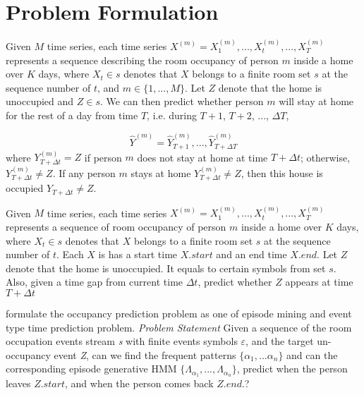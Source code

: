 \section{Problem Formulation}
Given $M$ time series, 
each time series $X^{(m)}=X^{(m)}_1, ..., X^{(m)}_t, ..., X_T^{(m)}$ 
represents a sequence describing the room occupancy of person $m$ inside 
a home over $K$ days, 
where $X_t\in s$ denotes that $X$ belongs to a finite room set $s$ at the sequence number of $t$, 
and $m\in\{1,...,M\}$. 
Let $Z$ denote that the home is unoccupied and $Z\in s$.  %
We can then predict whether person $m$ will stay at home for the rest of a day from time $T$,  i.e. during $T+1$, $T+2$, ..., $\Delta T$, 
 
\begin{equation}
\hat{Y}^{(m)}=\hat{Y}_{T+1}^{(m)},...,\hat{Y}^{(m)}_{T+\Delta T}
\end{equation}
where $Y_{T+\Delta t }^{(m)}=Z$ if person $m$ does not stay at home at time $T+\Delta t $;
otherwise, $Y_{T+\Delta t}^{(m)} \neq Z$. 
If any person $m$ stays at home $Y_{T+\Delta t}^{(m)} \neq Z$, then this house is occupied $Y_{T+ \Delta t} \neq Z$. 


\iffalse
Given $M$ time series, 
each time series $X^{(m)}=X^{(m)}_1, ..., X^{(m)}_t, ..., X_T^{(m)}$ 
represents a sequence of room occupancy of person $m$ inside 
a home over $K$ days, 
where $X_t\in s$ denotes that $X$ belongs to a finite room set $s$ at the sequence number of $t$. 
Each $X$ is has a start time $X.start$ and an end time $X.end$.  
Let $Z$ denote that the home is unoccupied. 
It equals to certain symbols from set $s$. 
Also, given a time gap from current time $\Delta t$, 
predict whether $Z$ appears at time  $T+\Delta t$

 formulate the occupancy prediction problem as one of 
episode mining and event type time prediction problem. 
\textit{Problem Statement} Given a sequence of the room occupation 
events stream \textit{s} with finite events symbols $\varepsilon$, 
and the target un-occupancy event \textit{Z}, can we
find the frequent patterns $\{\alpha_1,...\alpha_n\}$ 
and can the corresponding episode generative HMM 
$\{\Lambda_{\alpha_1}, ..., \Lambda_{\alpha_n}\}$, 
predict when 
the person leaves $Z.{start}$, 
and when the person comes back $Z.{end}$.?

